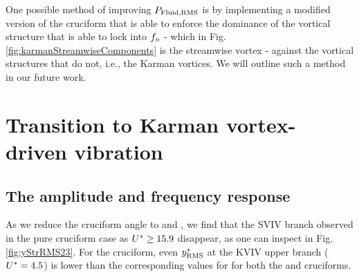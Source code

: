 \documentclass[oneside]{utmthesis}
\begin{document}
One possible method of improving $P_{\text{Fluid,RMS}}$ is by implementing a modified version of the cruciform that is able to enforce the dominance of the vortical structure that is able to lock into $f_{n}$ - which in Fig. \ref{fig:karmanStreamwiseComponents} is the streamwise vortex - against the vortical structures that do not, i.e., the Karman vortices. We will outline such a method in our future work.

\chapter{Transition to Karman vortex-driven vibration}\label{chap:transitionToKarman}

\section{The amplitude and frequency response}\label{sec:transRegimeAmpFreqResp}

As we reduce the cruciform angle to \angfo{} and \angth{}, we find that the SVIV branch observed in the pure cruciform case as $U^{*} \geq 15.9$ disappear, as one can inspect in Fig. \ref{fig:yStrRMS23}. For the \angth{} cruciform, even $y^{*}_{\text{RMS}}$ at the KVIV upper branch ($U^{*} = 4.5$) is lower than the corresponding values for for both the \angfi{} and \angfo{} cruciforms.
\end{document}
